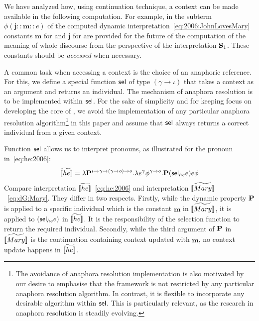 We have analyzed how, using continuation technique, a context can be made available in the following computation. For example, in the subterm $\phi (\textbf{j}::\textbf{m}::e)$ of the computed dynamic interpretation~\eqref{eq:2006:JohnLovesMary} constants $\textbf{m}$ for  and $\textbf{j}$ for  are provided for the future of the computation of the meaning of whole discourse from the perspective of the interpretation $\S_1$. 
These constants should be \emph{accessed} when necessary. 

A common task when accessing a context is the choice of an anaphoric reference. For this, we define a special function $\selK$ of type $(\gamma \rightarrow \iota)$ that takes a context as an argument and returns an individual. The mechanism of anaphora resolution is to be implemented within $\selK$. For the sake of simplicity and for keeping focus on developing the core of \TDL, we avoid the implementation of any particular anaphora resolution algorithm\footnote{The avoidance of anaphora resolution implementation is also motivated by our desire to emphasise that the framework is not restricted by any particular anaphora resolution algorithm. In contrast, it is flexible to incorporate any desirable algorithm within $\selK$. This is particularly relevant, as the research in anaphora resolution is steadily evolving.} in this paper and assume that $\selK$ always returns a correct individual from a given context. 

Function $\selK$ allows us to interpret pronouns, as illustrated for the pronoun  in~\eqref{eq:he:2006}:
\begin{align}
\etr{\I{he}} =  \lambda \P2^{\iota \rightarrow \gamma \rightarrow (\gamma \rightarrow o) \rightarrow o}. \lambda e^{\gamma} \phi^{\gamma \rightarrow o}. \P2 ( \selK_{he} e ) e \phi  \label{eq:he:2006}
\end{align}
Compare interpretation $\etr{\I{he}}$~\eqref{eq:he:2006} and interpretation $\etr{\I{Mary}}$~\eqref{eq:dG:Mary}. They differ in two respects. Firstly, while the dynamic property $\P2$ is applied to a specific individual which is the constant $\textbf{m}$ in $\etr{\I{Mary}}$, it is applied to $( \selK_{he} e )$ in $\etr{\I{he}}$. It is the responsibility of the selection function to return the required individual. Secondly, while the third argument of $\P2$ in $\etr{\I{Mary}}$ is the continuation containing context updated with $\textbf{m}$, no context update happens in $\etr{\I{he}}$.

